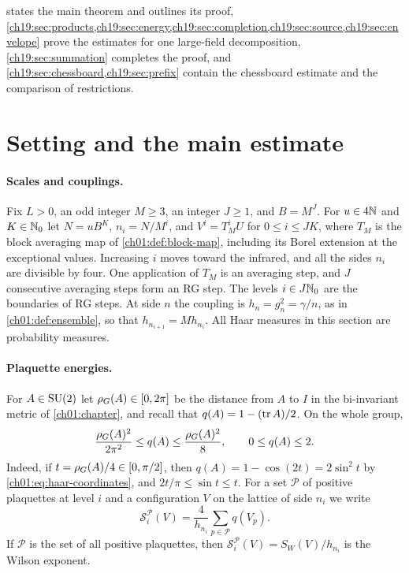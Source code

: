  states the main theorem and outlines its proof, \cref{ch19:sec:products,ch19:sec:energy,ch19:sec:completion,ch19:sec:source,ch19:sec:envelope} prove the estimates for one large-field decomposition, \cref{ch19:sec:summation} completes the proof, and \cref{ch19:sec:chessboard,ch19:sec:prefix} contain the chessboard estimate and the comparison of restrictions.

\section{Setting and the main estimate}\label{ch19:sec:setting}

\paragraph{Scales and couplings.}
Fix $L>0$, an odd integer $M\ge3$, an integer $J\ge1$, and $B=M^J$. For $u\in4\mathbb N$ and $K\in\mathbb N_0$ let $N=uB^K$, $n_i=N/M^i$, and $V^i=T_M^iU$ for $0\le i\le JK$, where $T_M$ is the block averaging map of \cref{ch01:def:block-map}, including its Borel extension at the exceptional values. Increasing $i$ moves toward the infrared, and all the sides $n_i$ are divisible by four. One application of $T_M$ is an averaging step, and $J$ consecutive averaging steps form an RG step. The levels $i\in J\mathbb N_0$ are the boundaries of RG steps. At side $n$ the coupling is $h_n=g_n^2=\gamma/n$, as in \cref{ch01:def:ensemble}, so that $h_{n_{i+1}}=Mh_{n_i}$. All Haar measures in this section are probability measures.

\paragraph{Plaquette energies.}
For $A\in\mathrm{SU}(2)$ let $\rho_G(A)\in[0,2\pi]$ be the distance from $A$ to $I$ in the bi-invariant metric of \cref{ch01:chapter}, and recall that $q(A)=1-(\operatorname{tr} A)/2$. On the whole group,
\begin{equation}\label{ch19:eq:angle-cost}
 \frac{\rho_G(A)^2}{2\pi^2}\le q(A)\le\frac{\rho_G(A)^2}{8},\qquad 0\le q(A)\le2.
\end{equation}
Indeed, if $t=\rho_G(A)/4\in[0,\pi/2]$, then $q(A)=1-\cos(2t)=2\sin^2t$ by \eqref{ch01:eq:haar-coordinates}, and $2t/\pi\le\sin t\le t$. For a set $\mathcal P$ of positive plaquettes at level $i$ and a configuration $V$ on the lattice of side $n_i$ we write
\[
 \mathcal S_i^{\mathcal P}(V)=\frac4{h_{n_i}}\sum_{p\in\mathcal P}q(V_p).
\]
If $\mathcal P$ is the set of all positive plaquettes, then $\mathcal S_i^{\mathcal P}(V)=S_W(V)/h_{n_i}$ is the Wilson exponent.

